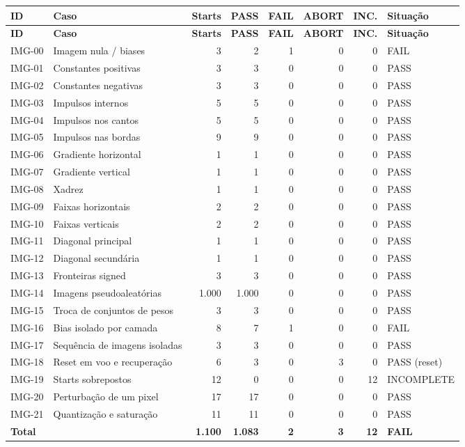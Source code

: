 \documentclass[12pt,a4paper]{article}
\begin{document}
\small
\begin{longtable}{l p{8.2cm} r r r r r l}
\toprule\textbf{ID} & \textbf{Caso} & \textbf{Starts} & \textbf{PASS} & \textbf{FAIL} & \textbf{ABORT} & \textbf{INC.} & \textbf{Situação}\\\midrule
\endfirsthead
\toprule\textbf{ID} & \textbf{Caso} & \textbf{Starts} & \textbf{PASS} & \textbf{FAIL} & \textbf{ABORT} & \textbf{INC.} & \textbf{Situação}\\\midrule
\endhead
IMG-00 & Imagem nula / biases & 3 & 2 & 1 & 0 & 0 & FAIL\\
IMG-01 & Constantes positivas & 3 & 3 & 0 & 0 & 0 & PASS\\
IMG-02 & Constantes negativas & 3 & 3 & 0 & 0 & 0 & PASS\\
IMG-03 & Impulsos internos & 5 & 5 & 0 & 0 & 0 & PASS\\
IMG-04 & Impulsos nos cantos & 5 & 5 & 0 & 0 & 0 & PASS\\
IMG-05 & Impulsos nas bordas & 9 & 9 & 0 & 0 & 0 & PASS\\
IMG-06 & Gradiente horizontal & 1 & 1 & 0 & 0 & 0 & PASS\\
IMG-07 & Gradiente vertical & 1 & 1 & 0 & 0 & 0 & PASS\\
IMG-08 & Xadrez & 1 & 1 & 0 & 0 & 0 & PASS\\
IMG-09 & Faixas horizontais & 2 & 2 & 0 & 0 & 0 & PASS\\
IMG-10 & Faixas verticais & 2 & 2 & 0 & 0 & 0 & PASS\\
IMG-11 & Diagonal principal & 1 & 1 & 0 & 0 & 0 & PASS\\
IMG-12 & Diagonal secundária & 1 & 1 & 0 & 0 & 0 & PASS\\
IMG-13 & Fronteiras signed & 3 & 3 & 0 & 0 & 0 & PASS\\
IMG-14 & Imagens pseudoaleatórias & 1.000 & 1.000 & 0 & 0 & 0 & PASS\\
IMG-15 & Troca de conjuntos de pesos & 3 & 3 & 0 & 0 & 0 & PASS\\
IMG-16 & Bias isolado por camada & 8 & 7 & 1 & 0 & 0 & FAIL\\
IMG-17 & Sequência de imagens isoladas & 3 & 3 & 0 & 0 & 0 & PASS\\
IMG-18 & Reset em voo e recuperação & 6 & 3 & 0 & 3 & 0 & PASS (reset)\\
IMG-19 & Starts sobrepostos & 12 & 0 & 0 & 0 & 12 & INCOMPLETE\\
IMG-20 & Perturbação de um pixel & 17 & 17 & 0 & 0 & 0 & PASS\\
IMG-21 & Quantização e saturação & 11 & 11 & 0 & 0 & 0 & PASS\\\midrule
\textbf{Total} & & \textbf{1.100} & \textbf{1.083} & \textbf{2} & \textbf{3} & \textbf{12} & \textbf{FAIL}\\\bottomrule
\end{longtable}
\normalsize
\end{document}
